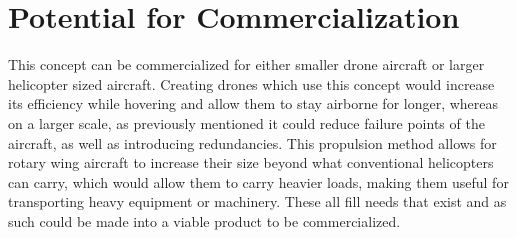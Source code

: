     \section{Potential for Commercialization}
        This concept can be commercialized for either smaller drone aircraft or larger helicopter sized aircraft. Creating drones which use this concept would increase its efficiency while hovering and allow them to stay airborne for longer, whereas on a larger scale, as previously mentioned it could reduce failure points of the aircraft, as well as introducing redundancies. This propulsion method allows for rotary wing aircraft to increase their size beyond what conventional helicopters can carry, which would allow them to carry heavier loads, making them useful for transporting heavy equipment or machinery. These all fill needs that exist and as such could be made into a viable product to be commercialized.
